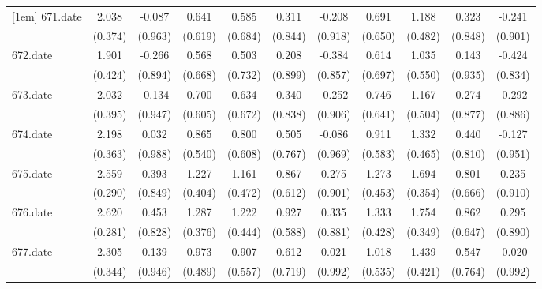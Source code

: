 \begin{tabular}{l*{10}{c}}
[1em]
671.date    &       2.038&      -0.087&       0.641&       0.585&       0.311&      -0.208&       0.691&       1.188&       0.323&      -0.241\\
            &     (0.374)&     (0.963)&     (0.619)&     (0.684)&     (0.844)&     (0.918)&     (0.650)&     (0.482)&     (0.848)&     (0.901)\\
[1em]
672.date    &       1.901&      -0.266&       0.568&       0.503&       0.208&      -0.384&       0.614&       1.035&       0.143&      -0.424\\
            &     (0.424)&     (0.894)&     (0.668)&     (0.732)&     (0.899)&     (0.857)&     (0.697)&     (0.550)&     (0.935)&     (0.834)\\
[1em]
673.date    &       2.032&      -0.134&       0.700&       0.634&       0.340&      -0.252&       0.746&       1.167&       0.274&      -0.292\\
            &     (0.395)&     (0.947)&     (0.605)&     (0.672)&     (0.838)&     (0.906)&     (0.641)&     (0.504)&     (0.877)&     (0.886)\\
[1em]
674.date    &       2.198&       0.032&       0.865&       0.800&       0.505&      -0.086&       0.911&       1.332&       0.440&      -0.127\\
            &     (0.363)&     (0.988)&     (0.540)&     (0.608)&     (0.767)&     (0.969)&     (0.583)&     (0.465)&     (0.810)&     (0.951)\\
[1em]
675.date    &       2.559&       0.393&       1.227&       1.161&       0.867&       0.275&       1.273&       1.694&       0.801&       0.235\\
            &     (0.290)&     (0.849)&     (0.404)&     (0.472)&     (0.612)&     (0.901)&     (0.453)&     (0.354)&     (0.666)&     (0.910)\\
[1em]
676.date    &       2.620&       0.453&       1.287&       1.222&       0.927&       0.335&       1.333&       1.754&       0.862&       0.295\\
            &     (0.281)&     (0.828)&     (0.376)&     (0.444)&     (0.588)&     (0.881)&     (0.428)&     (0.349)&     (0.647)&     (0.890)\\
[1em]
677.date    &       2.305&       0.139&       0.973&       0.907&       0.612&       0.021&       1.018&       1.439&       0.547&      -0.020\\
            &     (0.344)&     (0.946)&     (0.489)&     (0.557)&     (0.719)&     (0.992)&     (0.535)&     (0.421)&     (0.764)&     (0.992)\\

\end{tabular}
